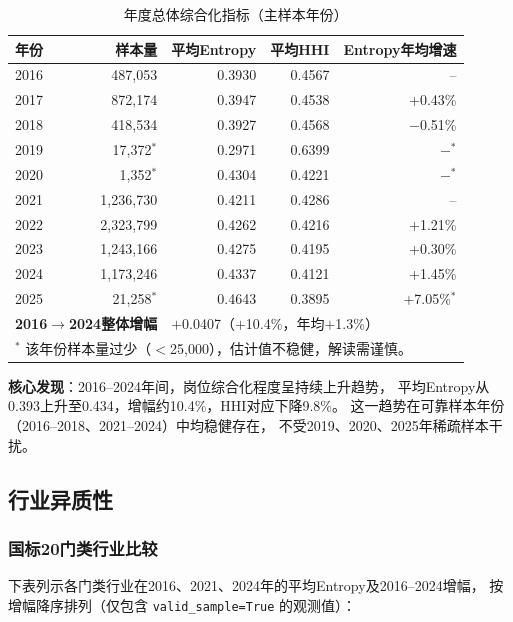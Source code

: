 \documentclass[12pt,a4paper]{ctexart}
\begin{document}
\begin{table}[H]
\centering
\caption{年度总体综合化指标（主样本年份）}
\begin{tabular}{lrrrr}
\toprule
年份 & 样本量 & 平均Entropy & 平均HHI & Entropy年均增速 \\
\midrule
2016 & 487,053 & 0.3930 & 0.4567 & -- \\
2017 & 872,174 & 0.3947 & 0.4538 & +0.43\% \\
2018 & 418,534 & 0.3927 & 0.4568 & $-$0.51\% \\
2019 & 17,372$^*$ & 0.2971 & 0.6399 & $-$$^*$ \\
2020 & 1,352$^*$ & 0.4304 & 0.4221 & $-$$^*$ \\
2021 & 1,236,730 & 0.4211 & 0.4286 & -- \\
2022 & 2,323,799 & 0.4262 & 0.4216 & +1.21\% \\
2023 & 1,243,166 & 0.4275 & 0.4195 & +0.30\% \\
2024 & 1,173,246 & 0.4337 & 0.4121 & +1.45\% \\
2025 & 21,258$^*$ & 0.4643 & 0.3895 & +7.05\%$^*$ \\
\midrule
\multicolumn{2}{l}{\textbf{2016$\to$2024整体增幅}} & \multicolumn{3}{l}{$+$0.0407（$+$10.4\%，年均$+$1.3\%）} \\
\bottomrule
\multicolumn{5}{l}{$^*$ 该年份样本量过少（$<$25,000），估计值不稳健，解读需谨慎。}
\end{tabular}
\end{table}

\textbf{核心发现}：2016--2024年间，岗位综合化程度呈持续上升趋势，
平均Entropy从0.393上升至0.434，增幅约10.4\%，HHI对应下降9.8\%。
这一趋势在可靠样本年份（2016--2018、2021--2024）中均稳健存在，
不受2019、2020、2025年稀疏样本干扰。

\subsection{行业异质性}

\subsubsection{国标20门类行业比较}

下表列示各门类行业在2016、2021、2024年的平均Entropy及2016--2024增幅，
按增幅降序排列（仅包含 \texttt{valid\_sample=True} 的观测值）：
\end{document}
